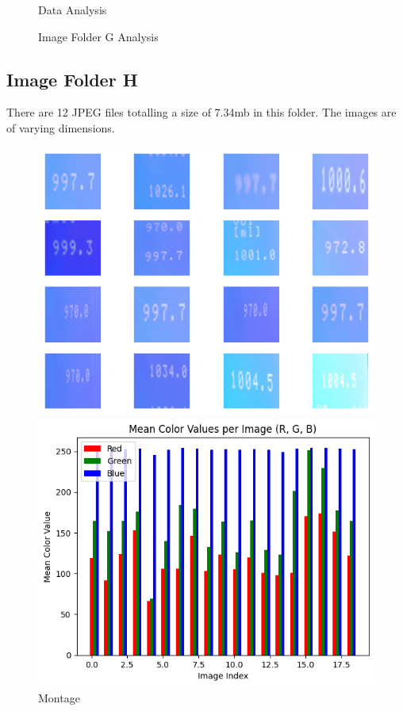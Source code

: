 \begin{figure}[ht]
\begin{minipage}[t]{0.50\textwidth}
        \caption*{Data Analysis}
    \end{minipage}
    \caption{Image Folder G Analysis}
    \label{fig:Image Folder G Analysis}
\end{figure}

\subsection{Image Folder H}

There are 12 JPEG files totalling a size of 7.34mb in this folder. The images are of varying dimensions.

\begin{figure}[ht]
    \centering
    \begin{minipage}[t]{0.25\textwidth}
        \centering
        \includegraphics[width=\textwidth]{Figures/EDA_Charts/9/montage.png}
        \caption*{Montage}
    \end{minipage}\hfill
    \begin{minipage}[t]{0.25\textwidth}
        \centering
        \includegraphics[width=\textwidth]{Figures/EDA_Charts/9/rgb.png}

\end{minipage}
\end{figure}
